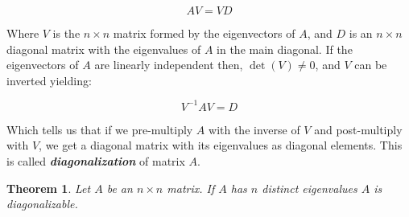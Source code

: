 \documentclass[a4paper,11pt]{article}
\theoremstyle{definition}
\theoremstyle{plain}
\newtheorem{theorem}{Theorem}
\begin{document}
\[
AV = VD
\]

Where \(V\) is the \(n\times n\) matrix formed by the eigenvectors of
\(A\), and \(D\) is an \(n\times n\) diagonal matrix with the
eigenvalues of \(A\) in the main diagonal. If the eigenvectors of \(A\)
are linearly independent then, \(\det(V) \neq 0\), and \(V\) can be
inverted yielding:

\[
V^{-1}AV = D
\]

Which tells us that if we pre-multiply \(A\) with the inverse
of \(V\) and post-multiply with $V$, we get a diagonal matrix with its eigenvalues as diagonal
elements. This is called \textbf{\emph{diagonalization}} of matrix
\(A\).

\begin{theorem}
Let \(A\) be an \(n\times n\) matrix. If \(A\) has
\(n\) distinct eigenvalues \(A\) is diagonalizable.
\end{theorem}
\end{document}
